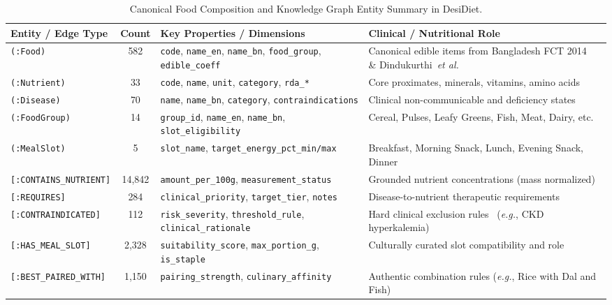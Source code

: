 \documentclass[5p,times,twocolumn]{elsarticle}
\makeatletter
\def\systemname{DesiDiet}%
\def\my@bx{bx}
\def\my@b{b}
\DeclareRobustCommand{\systemname}{%
  \texorpdfstring{%
    \ifx\f@series\my@bx
      DesiDiet%
    \else\ifx\f@series\my@b
      DesiDiet%
    \else
      \textsc{DesiDiet}%
    \fi\fi
  }{DesiDiet}%
}
\newcommand{\eg}{\textit{e.g.}}
\newcommand{\etal}{\textit{et al.}}
\makeatother
\begin{document}
\begin{table}[!t]
\centering
\caption{Canonical Food Composition and Knowledge Graph Entity Summary in \systemname{}.}
\label{tab:kg_entities}
\small
\begin{tabularx}{\textwidth}{lcp{6.5cm}X}
\toprule
\textbf{Entity / Edge Type} & \textbf{Count} & \textbf{Key Properties / Dimensions} & \textbf{Clinical / Nutritional Role} \\
\midrule
\texttt{(:Food)} & 582 & \texttt{code}, \texttt{name\_en}, \texttt{name\_bn}, \texttt{food\_group}, \texttt{edible\_coeff} & Canonical edible items from Bangladesh FCT 2014~\cite{bdfct2014} \& Dindukurthi~\etal{}~\cite{dindukurthi2026graphrag} \\
\texttt{(:Nutrient)} & 33 & \texttt{code}, \texttt{name}, \texttt{unit}, \texttt{category}, \texttt{rda\_*} & Core proximates, minerals, vitamins, amino acids \\
\texttt{(:Disease)} & 70 & \texttt{name}, \texttt{name\_bn}, \texttt{category}, \texttt{contraindications} & Clinical non-communicable and deficiency states~\cite{dindukurthi2026graphrag} \\
\texttt{(:FoodGroup)} & 14 & \texttt{group\_id}, \texttt{name\_en}, \texttt{name\_bn}, \texttt{slot\_eligibility} & Cereal, Pulses, Leafy Greens, Fish, Meat, Dairy, etc. \\
\texttt{(:MealSlot)} & 5 & \texttt{slot\_name}, \texttt{target\_energy\_pct\_min/max} & Breakfast, Morning Snack, Lunch, Evening Snack, Dinner \\
\midrule
\texttt{[:CONTAINS\_NUTRIENT]} & 14,842 & \texttt{amount\_per\_100g}, \texttt{measurement\_status} & Grounded nutrient concentrations (mass normalized) \\
\texttt{[:REQUIRES]} & 284 & \texttt{clinical\_priority}, \texttt{target\_tier}, \texttt{notes} & Disease-to-nutrient therapeutic requirements~\cite{dindukurthi2026graphrag} \\
\texttt{[:CONTRAINDICATED]} & 112 & \texttt{risk\_severity}, \texttt{threshold\_rule}, \texttt{clinical\_rationale} & Hard clinical exclusion rules~\cite{dindukurthi2026graphrag} (\eg{}, CKD hyperkalemia) \\
\texttt{[:HAS\_MEAL\_SLOT]} & 2,328 & \texttt{suitability\_score}, \texttt{max\_portion\_g}, \texttt{is\_staple} & Culturally curated slot compatibility and role \\
\texttt{[:BEST\_PAIRED\_WITH]} & 1,150 & \texttt{pairing\_strength}, \texttt{culinary\_affinity} & Authentic combination rules (\eg{}, Rice with Dal and Fish) \\
\bottomrule
\end{tabularx}
\end{table}
\end{document}
